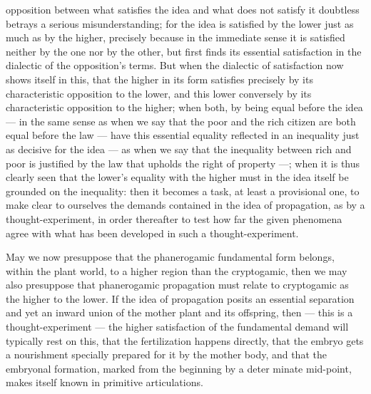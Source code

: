 \documentclass[12pt,a4paper]{book}
\begin{document}
opposition between what satisfies the idea and what does not satisfy it doubtless
betrays a serious misunderstanding; for the idea is satisfied by the lower just as
much as by the higher, precisely because in the immediate sense it is satisfied
neither by the one nor by the other, but first finds its essential satisfaction in
the dialectic of the opposition's terms. But when the dialectic of satisfaction
now shows itself in this, that the higher in its form satisfies precisely by its
characteristic opposition to the lower, and this lower conversely by its
characteristic opposition to the higher; when both, by being equal before the idea
--- in the same sense as when we say that the poor and the rich citizen are both
equal before the law --- have this essential equality reflected in an inequality
just as decisive for the idea --- as when we say that the inequality between rich
and poor is justified by the law that upholds the right of property ---; when it
is thus clearly seen that the lower's equality with the higher must in the idea
itself be grounded on the inequality: then it becomes a task, at least a
provisional one, to make clear to ourselves the demands contained in the idea of
propagation, as by a thought-experiment, in order thereafter to test how far the
given phenomena agree with what has been developed in such a thought-experiment.

May we now presuppose that the phanerogamic fundamental form belongs, within the
plant world, to a higher region than the cryptogamic, then we may also presuppose
that phanerogamic propagation must relate to cryptogamic as the higher to the
lower. If the idea of propagation posits an essential separation and yet an inward
union of the mother plant and its offspring, then --- this is a thought-experiment
--- the higher satisfaction of the fundamental demand will typically rest on this,
that the fertilization happens directly, that the embryo gets a nourishment
specially prepared for it by the mother body, and that the embryonal formation,
marked from the beginning by a deter%
\setcounter{footnote}{0}%
minate mid-point, makes itself known in primitive articulations.
\end{document}

